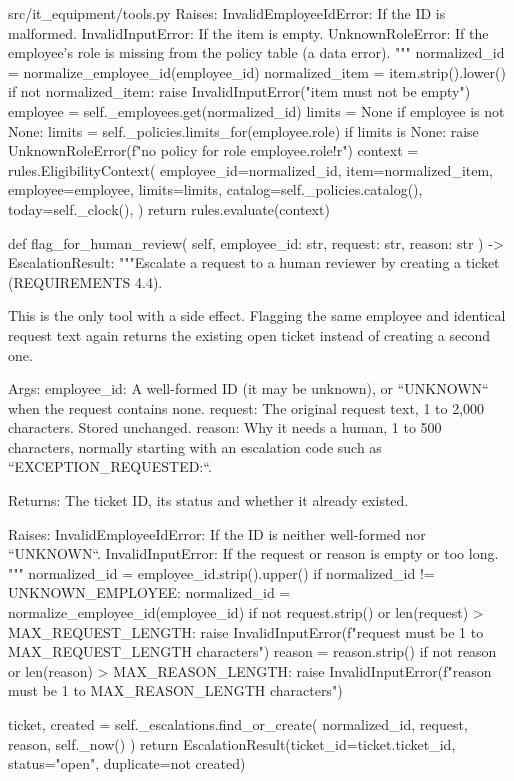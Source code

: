 \documentclass[11pt,letterpaper]{article}
\renewcommand{\_}{\textunderscore\allowbreak}
\begin{document}
\begin{codebox}{src/it_equipment/tools.py}
        Raises:
            InvalidEmployeeIdError: If the ID is malformed.
            InvalidInputError: If the item is empty.
            UnknownRoleError: If the employee's role is missing from the policy table
                (a data error).
        """
        normalized_id = normalize_employee_id(employee_id)
        normalized_item = item.strip().lower()
        if not normalized_item:
            raise InvalidInputError("item must not be empty")
        employee = self._employees.get(normalized_id)
        limits = None
        if employee is not None:
            limits = self._policies.limits_for(employee.role)
            if limits is None:
                raise UnknownRoleError(f"no policy for role {employee.role!r}")
        context = rules.EligibilityContext(
            employee_id=normalized_id,
            item=normalized_item,
            employee=employee,
            limits=limits,
            catalog=self._policies.catalog(),
            today=self._clock(),
        )
        return rules.evaluate(context)

    def flag_for_human_review(
        self, employee_id: str, request: str, reason: str
    ) -> EscalationResult:
        """Escalate a request to a human reviewer by creating a ticket (REQUIREMENTS 4.4).

        This is the only tool with a side effect. Flagging the same employee and identical
        request text again returns the existing open ticket instead of creating a second one.

        Args:
            employee_id: A well-formed ID (it may be unknown), or ``UNKNOWN`` when the
                request contains none.
            request: The original request text, 1 to 2,000 characters. Stored unchanged.
            reason: Why it needs a human, 1 to 500 characters, normally starting with an
                escalation code such as ``EXCEPTION_REQUESTED:``.

        Returns:
            The ticket ID, its status and whether it already existed.

        Raises:
            InvalidEmployeeIdError: If the ID is neither well-formed nor ``UNKNOWN``.
            InvalidInputError: If the request or reason is empty or too long.
        """
        normalized_id = employee_id.strip().upper()
        if normalized_id != UNKNOWN_EMPLOYEE:
            normalized_id = normalize_employee_id(employee_id)
        if not request.strip() or len(request) > MAX_REQUEST_LENGTH:
            raise InvalidInputError(f"request must be 1 to {MAX_REQUEST_LENGTH} characters")
        reason = reason.strip()
        if not reason or len(reason) > MAX_REASON_LENGTH:
            raise InvalidInputError(f"reason must be 1 to {MAX_REASON_LENGTH} characters")

        ticket, created = self._escalations.find_or_create(
            normalized_id, request, reason, self._now()
        )
        return EscalationResult(ticket_id=ticket.ticket_id, status="open", duplicate=not created)
\end{codebox}
\end{document}
